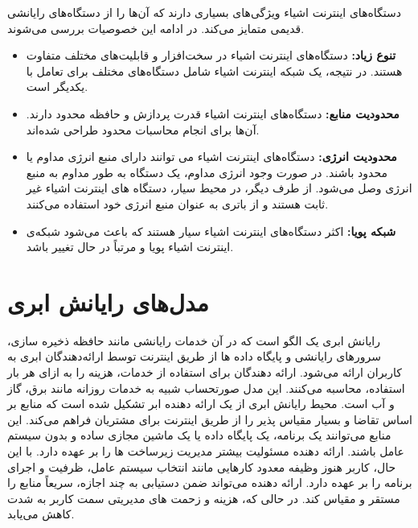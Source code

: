 \newpage

دستگاه‌های اینترنت اشیاء ویژگی‌های بسیاری دارند که آن‌ها را از دستگاه‌های رایانشی قدیمی متمایز می‌کند. در ادامه این خصوصیات بررسی می‌شوند.

\begin{itemize}
	
	\item \textbf{تنوع زیاد:} دستگاه‌های اینترنت اشیاء در سخت‌افزار و قابلیت‌های مختلف متفاوت هستند. در نتیجه، یک شبکه اینترنت اشیاء شامل دستگاه‌های مختلف برای تعامل با یکدیگر است.
	
	\item \textbf{محدودیت منابع:} دستگاه‌های اینترنت اشیاء قدرت پردازش و حافظه محدود دارند. آن‌ها برای انجام محاسبات محدود طراحی شده‌اند.
	
	\item \textbf{محدودیت انرژی:} دستگاه‌های اینترنت اشیاء می توانند دارای منبع انرژی مداوم یا محدود باشند. در صورت وجود انرژی مداوم، یک دستگاه به طور مداوم به منبع انرژی وصل می‌شود. از طرف دیگر، در محیط سیار، دستگاه های اینترنت اشیاء غیر ثابت هستند و از باتری به عنوان منبع انرژی خود استفاده می‌کنند.
	
	\item \textbf{شبکه پویا:} اکثر دستگاه‌های اینترنت اشیاء سیار هستند که باعث می‌شود شبکه‌ی اینترنت اشیاء پویا و مرتباً در حال تغییر باشد.
	
\end{itemize}

\newpage

\section{مدل‌های رایانش ابری}

رایانش ابری یک الگو است که در آن خدمات رایانشی مانند حافظه ذخیره سازی، سرورهای رایانشی و پایگاه داده ها از طریق اینترنت توسط ارائه‌دهندگان ابری به کاربران ارائه می‌شود. ارائه دهندگان برای استفاده از خدمات، هزینه را به ازای هر بار استفاده، محاسبه می‌کنند. این مدل صورتحساب شبیه به خدمات روزانه مانند برق، گاز و آب است. محیط رایانش ابری از یک ارائه دهنده ابر تشکیل شده است که منابع بر اساس تقاضا و بسیار مقیاس پذیر را از طریق اینترنت برای مشتریان فراهم می‌کند. این منابع می‌توانند یک برنامه، یک پایگاه داده یا یک ماشین مجازی ساده و بدون سیستم عامل باشند. ارائه دهنده مسئولیت بیشتر مدیریت زیرساخت ها را بر عهده دارد. با این حال، کاربر هنوز وظیفه معدود کارهایی مانند انتخاب سیستم عامل، ظرفیت و اجرای برنامه را بر عهده دارد. ارائه دهنده می‌تواند ضمن دستیابی به چند اجازه، سریعاً منابع را مستقر و مقیاس کند. در حالی که، هزینه و زحمت های مدیریتی سمت کاربر به شدت کاهش می‌یابد.

